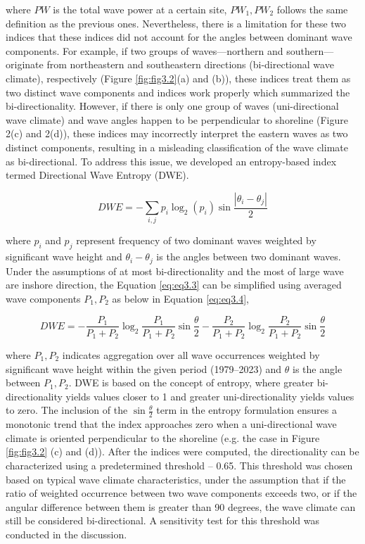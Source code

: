 where $PW$ is the total wave power at a certain site, $PW_1, PW_2$ follows the same definition as the previous ones. Nevertheless, there is a limitation for these two indices that these indices did not account for the angles between dominant wave components. For example, if two groups of waves—northern and southern—originate from northeastern and southeastern directions (bi-directional wave climate), respectively (Figure \ref{fig:fig3.2}(a) and (b)), these indices treat them as two distinct wave components and indices work properly which summarized the bi-directionality. However, if there is only one group of waves (uni-directional wave climate) and wave angles happen to be perpendicular to shoreline (Figure 2(c) and 2(d)), these indices may incorrectly interpret the eastern waves as two distinct components, resulting in a misleading classification of the wave climate as bi-directional. To address this issue, we developed an entropy-based index termed Directional Wave Entropy (DWE). 

\begin{equation}
DWE = -\sum_{i,j}p_i\log_2(p_i)\sin{\frac{|\theta_i - \theta_j|}{2}}
\label{eq:eq3.3}
\end{equation}

where $p_i$ and $p_j$ represent frequency of two dominant waves weighted by significant wave height and $\theta_i-\theta_j$ is the angles between two dominant waves. Under the assumptions of at most bi-directionality and the most of large wave are inshore direction, the Equation \ref{eq:eq3.3} can be simplified using averaged wave components $P_1,P_2$ as below in Equation \ref{eq:eq3.4},

\begin{equation}
    DWE = - \frac{P_1}{P_1+P_2}\log_2\frac{P_1}{P_1+P_2}\sin{\frac{\theta}{2}}- \frac{P_2}{P_1+P_2}\log_2\frac{P_2}{P_1+P_2}\sin{\frac{\theta}{2}}
\label{eq:eq3.4}
\end{equation}

where $P_1, P_2$ indicates aggregation over all wave occurrences weighted by significant wave height within the given period (1979–2023) and $\theta$ is the angle between $P_1, P_2$. DWE is based on the concept of entropy, where greater bi-directionality yields values closer to 1 and greater uni-directionality yields values to zero. The inclusion of the $\sin{\frac{\theta}{2}}$ term in the entropy formulation ensures a monotonic trend that the index approaches zero when a uni-directional wave climate is oriented perpendicular to the shoreline (e.g. the case in  Figure \ref{fig:fig3.2} (c) and (d)). After the indices were computed, the directionality can be characterized using a predetermined threshold – 0.65. This threshold was chosen based on typical wave climate characteristics, under the assumption that if the ratio of weighted occurrence between two wave components exceeds two, or if the angular difference between them is greater than 90 degrees, the wave climate can still be considered bi-directional. A sensitivity test for this threshold was conducted in the discussion.

